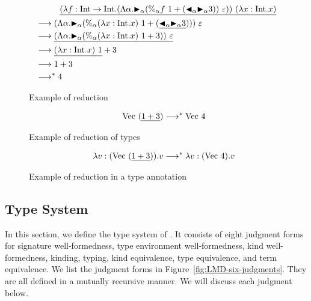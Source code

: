 \begin{figure}[tbp]
\begin{align*}
    & \hspace{10mm} \underline{(\lambda f:\I\to\I.(\Lambda\alpha.\TB_\alpha (\%_\alpha f\ 1 + (\TBL_\alpha \TB_\alpha 3))\ \varepsilon))\ (\lambda x:\I.x)} \\
    & \longrightarrow (\Lambda\alpha.\TB_\alpha (\%_\alpha (\lambda x:\I.x)\ 1 + (\underline{\TBL_\alpha \TB_\alpha 3})))\ \varepsilon        \\
    & \longrightarrow \underline{(\Lambda\alpha.\TB_\alpha (\%_\alpha (\lambda x:\I.x)\ 1 + 3))\ \varepsilon}                                         \\
    & \longrightarrow \underline{(\lambda x:\I.x)\ 1} + 3                                                                                           \\
    & \longrightarrow 1 + 3                                                                                                                           \\
    & \longrightarrow^* 4
\end{align*}
    \caption{Example of reduction}
    \label{fig:example-of-reduction}
\end{figure}

\begin{figure}[tbp]
    \begin{align*}
        & \hspace{10mm} \text{Vec }(\underline{1+3}) \longrightarrow^* \text{Vec }4
    \end{align*}
    \caption{Example of reduction of types}
    \label{fig:type-reduction}
\end{figure}

\begin{figure}[tbp]
    \begin{align*}
        & \hspace{10mm} \lambda v:(\text{Vec }(\underline{1+3})).v \longrightarrow^* \lambda v:(\text{Vec }4).v
    \end{align*}
    \caption{Example of reduction in a type annotation}
    \label{fig:reduction-in-type-annotations}
\end{figure}

\subsection{Type System}

In this section, we define the type system of \LMD.  It consists of eight
judgment forms for signature well-formedness, type environment well-formedness,
kind well-formedness, kinding, typing, kind equivalence, type equivalence, and
term equivalence.  We list the judgment forms in
Figure~\ref{fig:LMD-six-judgments}. They are all defined in a mutually
recursive manner. We will discuss each judgment below.

